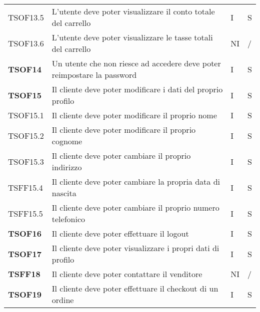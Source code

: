 \begin{center}
\begin{longtable}[!h]{p{60px} p{240px} p{35px} p{35px}}
        TSOF13.5        & L'utente deve poter visualizzare il conto totale del carrello                                       & I              & S              \\
        TSOF13.6        & L'utente deve poter visualizzare le tasse totali del carrello                                       & NI             & /              \\
        \textbf{TSOF14} & Un utente che non riesce ad accedere deve poter reimpostare la password                             & I              & S              \\
        \textbf{TSOF15} & Il cliente deve poter modificare i dati del proprio profilo                                         & I              & S              \\
        TSOF15.1        & Il cliente deve poter modificare il proprio nome                                                    & I              & S              \\
        TSOF15.2        & Il cliente deve poter modificare il proprio cognome                                                 & I              & S              \\
        TSOF15.3        & Il cliente deve poter cambiare il proprio indirizzo                                                 & I              & S              \\
        TSFF15.4        & Il cliente deve poter cambiare la propria data di nascita                                           & I              & S              \\
        TSFF15.5        & Il cliente deve poter cambiare il proprio numero telefonico                                         & I              & S              \\
        \textbf{TSOF16} & Il cliente deve poter effettuare il logout                                                          & I              & S              \\
        \textbf{TSOF17} & Il cliente deve poter visualizzare i propri dati di profilo                                         & I              & S              \\
        \textbf{TSFF18} & Il cliente deve poter contattare il venditore                                                       & NI             & /              \\
        \textbf{TSOF19} & Il cliente deve poter effettuare il checkout di un ordine                                           & I              & S              \\

\end{longtable}
\end{center}

